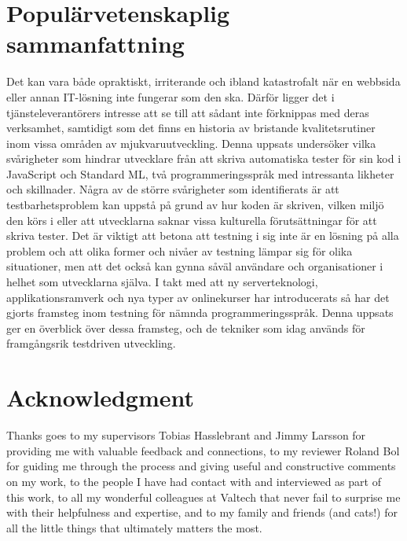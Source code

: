\newpage
\null
\newpage

\section*{Populärvetenskaplig sammanfattning}

Det kan vara både opraktiskt, irriterande och ibland katastrofalt när en webbsida eller annan IT-lösning inte fungerar som den ska. Därför ligger det i tjänsteleverantörers intresse att se till att sådant inte förknippas med deras verksamhet, samtidigt som det finns en historia av bristande kvalitetsrutiner inom vissa områden av mjukvaruutveckling. Denna uppsats undersöker vilka svårigheter som hindrar utvecklare från att skriva automatiska tester för sin kod i JavaScript och Standard ML, två programmeringsspråk med intressanta likheter och skillnader. Några av de större svårigheter som identifierats är att testbarhetsproblem kan uppstå på grund av hur koden är skriven, vilken miljö den körs i eller att utvecklarna saknar vissa kulturella förutsättningar för att skriva tester. Det är viktigt att betona att testning i sig inte är en lösning på alla problem och att olika former och nivåer av testning lämpar sig för olika situationer, men att det också kan gynna såväl användare och organisationer i helhet som utvecklarna själva. I takt med att ny serverteknologi, applikationsramverk och nya typer av onlinekurser har introducerats så har det gjorts framsteg inom testning för nämnda programmeringsspråk. Denna uppsats ger en överblick över dessa framsteg, och de tekniker som idag används för framgångsrik testdriven utveckling.

\newpage
\null
\newpage

\section*{Acknowledgment}

Thanks goes to my supervisors Tobias Hasslebrant and Jimmy Larsson for providing me with valuable feedback and connections, to my reviewer Roland Bol for guiding me through the process and giving useful and constructive comments on my work, to the people I have had contact with and interviewed as part of this work, to all my wonderful colleagues at Valtech that never fail to surprise me with their helpfulness and expertise, and to my family and friends (and cats!) for all the little things that ultimately matters the most.

\newpage
\null
\newpage

\tableofcontents

\newpage
\null
\newpage

